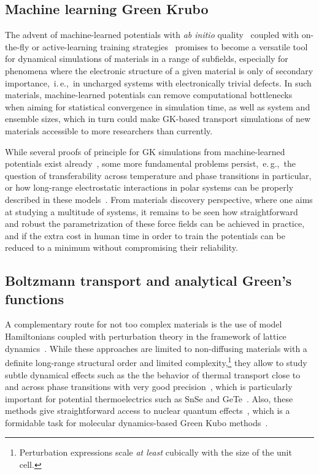 \subsection{Machine learning Green Krubo}
The advent of machine-learned potentials with \emph{ab initio} quality~\cite{Behler2007,Bartok2010,Bartok2013,shapeev2016} coupled with on-the-fly or active-learning training strategies~\cite{Li2015,Jinnouchi2019,podryabinkin2017,Liu2021} promises to become a versatile tool for dynamical simulations of materials in a range of subfields, especially for phenomena where the electronic structure of a given material is only of secondary importance,~i.\,e.,~in uncharged systems with electronically trivial defects. In such materials, machine-learned potentials can remove computational bottlenecks when aiming for statistical convergence in simulation time, as well as system and ensemble sizes, which in turn could make GK-based transport simulations of new materials accessible to more researchers than currently.

While several proofs of principle for GK simulations from machine-learned potentials exist already~\cite{Korotaev2019,Li2020,Mangold2020}, some more fundamental problems persist,~e.\,g.,~the question of transferability across temperature and phase transitions in particular, or how long-range electrostatic interactions in polar systems can be properly described in these models~\cite{Artrith2011,Grisafi2019,yue2021,kovacs2021}. From materials discovery perspective, where one aims at studying a multitude of systems, it remains to be seen how straightforward and robust the parametrization of these force fields can be achieved in practice, and if the extra cost in human time in order to train the potentials can be reduced to a minimum without compromising their reliability.

\subsection{Boltzmann transport and analytical Green's functions}
A complementary route for not too complex materials is the use of model Hamiltonians coupled with perturbation theory in the framework of lattice dynamics~\cite{Esfarjani2008,Hellman2013,Hellman2013b,errea2014,tadano2018,Zhou2019}. While these approaches are limited to non-diffusing materials with a definite long-range structural order and limited complexity,\footnote{Perturbation expressions scale \emph{at least} cubically with the size of the unit cell.} they allow to study subtle dynamical effects such as the the behavior of thermal transport close to and across phase transitions with very good precision~\cite{dangic2021}, which is particularly important for potential thermoelectrics such as SnSe and GeTe~\cite{Zhao2014,Dewandre2016,dangic2021}. Also, these methods give straightforward access to nuclear quantum effects~\cite{shulumba2017}, which is a formidable task for molecular dynamics-based Green Kubo methods~\cite{luo2020,sutherland2021}.

